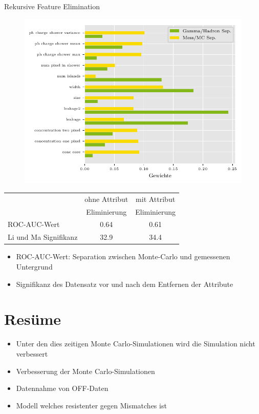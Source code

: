 \documentclass[aspectratio=1610, professionalfonts, 9pt]{beamer}
\begin{document}
\begin{frame}{Rekursive Feature Elimination}
  \begin{figure}
	\centering
	\includegraphics[height=0.9\textheight]{./Plots/feature_elemination.pdf}
  \end{figure}
\end{frame}

\begin{frame}
  \begin{table}
	\centering
	\begin{tabular}{l c c}
	  \toprule
	  & ohne Attribut & mit Attribut \\
	  & Eliminierung  & Eliminierung \\
	  \cmidrule(r){2-3}
	  ROC-AUC-Wert            & \num{0.64} & \num{0.61} \\
	  Li und Ma Signifikanz   & \SI{32.9}{\sigma} & \SI{34.4}{\sigma} \\
	  \bottomrule
	\end{tabular}
  \end{table}
  \vspace{1cm}
  \begin{itemize}
	\item ROC-AUC-Wert: Separation zwischen Monte-Carlo und gemessenen Untergrund
	\item Signifikanz des Datensatz vor und nach dem Entfernen der Attribute
  \end{itemize}
\end{frame}

\section{Resüme}
\begin{frame}
  \begin{itemize}
	\item<1-> Unter den dies zeitigen Monte Carlo-Simulationen wird die Simulation nicht verbessert 
	\item<2-> Verbesserung der Monte Carlo-Simulationen 
	\item<3-> Datennahme von OFF-Daten
	\item<4-> Modell welches resistenter gegen Mismatches ist
  \end{itemize}
\end{frame}
\end{document}

